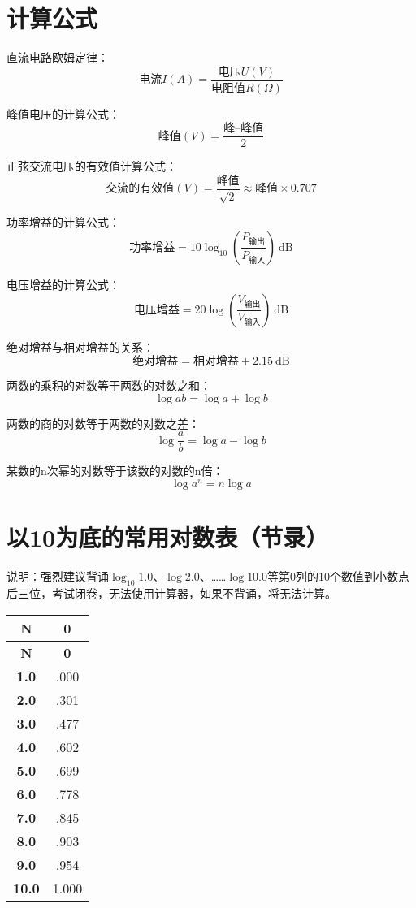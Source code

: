 \newpage










\section{计算公式}

直流电路欧姆定律：
$$\mbox{电流}I(A)=\frac{\mbox{电压}U(V)}{\mbox{电阻值}R(\Omega)}$$

峰值电压的计算公式：
$$\mbox{峰值}(V)=\frac{\mbox{峰--峰值}}{2}$$

正弦交流电压的有效值计算公式：
$$\mbox{交流的有效值}(V)=\frac{\mbox{峰值}}{\sqrt{2}} \approx \mbox{峰值}\times0.707$$

功率增益的计算公式：
$$\mbox{功率增益}=10 \log_{10} \left( {\frac{P_{ \mbox{输出} }}{P_{ \mbox{输入} }}}\right)\ \mathrm{dB}$$

电压增益的计算公式：
$$\mbox{电压增益}=20 \log \left( {\frac{V_{ \mbox{输出} }}{V_{ \mbox{输入} }}} \right)\ \mathrm{dB}$$


绝对增益与相对增益的关系：
$$\mbox{绝对增益} = \mbox{相对增益} + 2.15 \ \mathrm{dB}$$

两数的乘积的对数等于两数的对数之和：
$$\log ab=\log a+\log b$$

两数的商的对数等于两数的对数之差：
$$\log\frac{a}{b}=\log a-\log b$$

某数的n次幂的对数等于该数的对数的n倍：
$$\log a^n =n\log a$$

\newpage


\section{以10为底的常用对数表（节录）}

说明：强烈建议背诵$\log_{10} 1.0$、$\log 2.0$、……$\log 10.0$等第0列的10个数值到小数点后三位，考试闭卷，无法使用计算器，如果不背诵，将无法计算。

\begin{longtable}[c]{|c|c|}
\hline
\textbf{N} & \textbf{0} \\
\hline
\endfirsthead
\hline
\textbf{N} & \textbf{0} \\
\endhead
\textbf{1.0} & .000 \\ \hline
\textbf{2.0} & .301 \\ \hline
\textbf{3.0} & .477 \\ \hline
\textbf{4.0} & .602 \\ \hline
\textbf{5.0} & .699 \\ \hline
\textbf{6.0} & .778 \\ \hline
\textbf{7.0} & .845 \\ \hline
\textbf{8.0} & .903 \\ \hline
\textbf{9.0} & .954 \\ \hline
\textbf{10.0} & 1.000 \\ \hline
\end{longtable}

